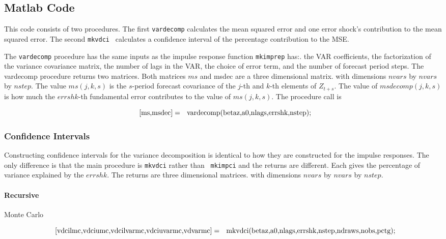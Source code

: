 \documentclass{article}
\begin{document}
\subsection{Matlab Code}

This code consists of two procedures. The first \texttt{vardecomp}
calculates the mean squared error and one error shock's contribution to the
mean squared error. The second \texttt{mkvdci } calculates a confidence
interval of the percentage contribution to the MSE.

The \texttt{vardecomp} procedure has the same inputs as the impulse response
function \texttt{mkimprep} has:. the VAR coefficients, the factorization of
the variance covariance matrix, the number of lags in the VAR, the choice of
error term, and the number of forecast period steps. The vardecomp procedure
returns two matrices. Both matrices $ms$ and msdec are a three dimensional
matrix. with dimensions $nvars$ by $nvars$ by $nstep$. The value $ms(j,k,s)$
is the $s$-period forecast covariance of the $j$-th and $k$-th elements of $%
Z_{t+s}.$ The value of $msdecomp(j,k,s)$ is how much the $errshk$-th
fundamental error contributes to the value of $ms(j,k,s)$. The procedure
call is

\begin{equation*}
\text{\lbrack ms,msdec]}=\text{vardecomp(betaz,a0,nlags,errshk,nstep);}
\end{equation*}

\subsubsection{Confidence Intervals}

Constructing confidence intervals for the variance decomposition is
identical to how they are constructed for the impulse responses. The only
difference is that the main procedure is \texttt{mkvdci} rather than \texttt{%
mkimpci} and the returns are different. Each gives the percentage of
variance explained by the $errshk$. The returns are three dimensional
matrices. with dimensions $nvars$ by $nvars$ by $nstep.$

\paragraph{Recursive}

Monte Carlo

\begin{equation*}
\text{\lbrack vdcilmc,vdciumc,vdcilvarmc,vdciuvarmc,vdvarmc]}=\text{%
mkvdci(betaz,a0,nlags,errshk,nstep,ndraws,nobs,pctg);}
\end{equation*}
\end{document}
